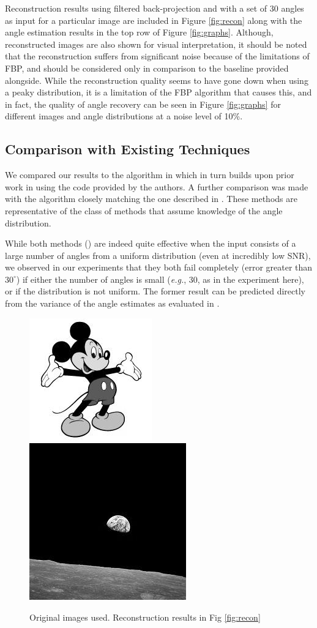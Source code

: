 \documentclass{article}
\begin{document}
Reconstruction results using filtered back-projection and with a set of 30 angles as input for a particular image are included in Figure \ref{fig:recon} along with the angle estimation results in the top row of Figure \ref{fig:graphs}. Although, reconstructed images are also shown for visual interpretation, it should be noted that the reconstruction suffers from significant noise because of the limitations of FBP, and should be considered only in comparison to the baseline provided alongside. While the reconstruction quality seems to have gone down when using a peaky distribution, it is a limitation of the FBP algorithm that causes this, and in fact, the quality of angle recovery can be seen in Figure \ref{fig:graphs} for different images and angle distributions at a noise level of 10\%.   

\subsection{Comparison with Existing Techniques}
We compared our results to the algorithm in \cite{singer2013} which in turn builds upon prior work in \cite{graphlaplacian} using the code provided by the authors. A further comparison was made with the  algorithm closely matching the one described in \cite{feasibility}.  These methods are representative of the class of methods that assume knowledge of the angle distribution. 

While both methods (\cite{feasibility, singer2013}) are indeed quite effective when the input consists of a large number of angles from a uniform distribution (even at incredibly low SNR), we observed in our experiments that they both fail completely (error greater than $30^{\circ}$) if either the number of angles is small (\textit{e.g.}, 30, as in the experiment here), or if the distribution is not uniform. The former result can be predicted directly from the variance of the angle estimates as evaluated in \cite{graphlaplacian}. 


\begin{figure}[htb]
\centering
\includegraphics[width=0.25\linewidth]{images/mickey_grey.jpg}
\includegraphics[width=0.25\linewidth]{images/earthrise_actual.jpg}
\caption{Original images used. Reconstruction results in Fig \ref{fig:recon}}
\label{fig:original}
\end{figure}
\end{document}
